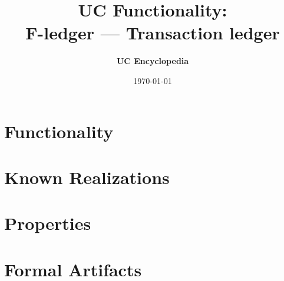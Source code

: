 \documentclass[11pt,a4paper]{article}
\title{\textbf{\Large UC Functionality:}\\[0.2em] \Large F-ledger --- Transaction ledger}
\author{\textbf{UC Encyclopedia}}
\date{\today}
\newtheorem{functionality}{Functionality}
\begin{document}
\maketitle

\begin{abstract}
\end{abstract}

\section{Functionality}

%

\section{Known Realizations}


\section{Properties}


\section{Formal Artifacts}

\end{document}
